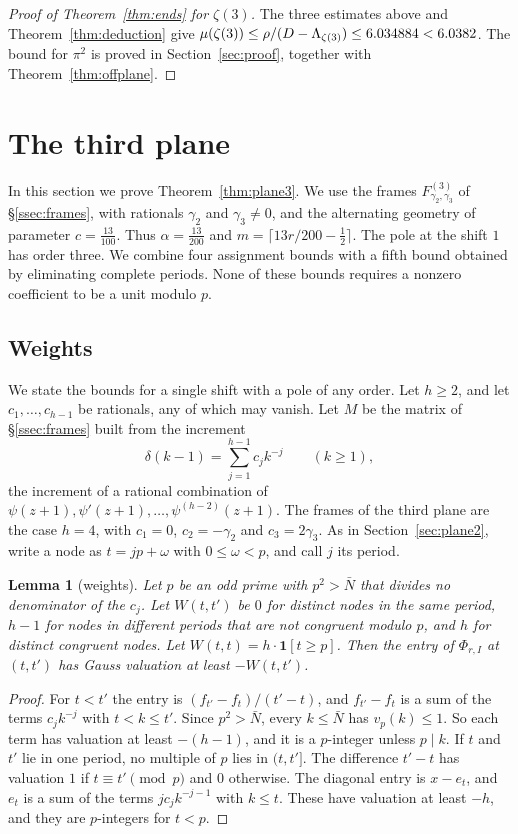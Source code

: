 \documentclass[11pt]{amsart}
\newtheorem{lemma}[theorem]{Lemma}
\theoremstyle{definition}
\theoremstyle{remark}
\numberwithin{equation}{section}
\newcommand{\MuZetaThree}{6.0382}
\begin{document}
\begin{proof}[Proof of Theorem~\ref{thm:ends} for $\zeta(3)$]
The three estimates above and Theorem~\ref{thm:deduction} give
$\mu(\zeta(3))\le\rho/(D-\Lambda_{\zeta(3)})\le\ExpZ<\MuZetaThree$. The bound for $\pi^2$ is proved in
Section~\ref{sec:proof}, together with Theorem~\ref{thm:offplane}.
\end{proof}

\section{The third plane}\label{sec:plane3}

In this section we prove Theorem~\ref{thm:plane3}. We use the frames $F^{(3)}_{\gamma_2,\gamma_3}$
of \S\ref{ssec:frames}, with rationals $\gamma_2$ and $\gamma_3\ne0$, and the alternating geometry of parameter
$c=\frac{13}{100}$. Thus $\alpha=\frac{13}{200}$ and $m=\lceil13r/200-\frac12\rceil$. The pole at the shift $1$ has
order three. We combine four assignment bounds with a fifth bound obtained by eliminating complete periods.
None of these bounds requires a nonzero coefficient to be a unit modulo $p$.

\subsection{Weights}
We state the bounds for a single shift with a pole of any order. Let $h\ge2$, and let $c_1,\dots,c_{h-1}$ be rationals,
any of which may vanish. Let $M$ be the matrix of \S\ref{ssec:frames} built from the increment
\[
 \delta(k-1)=\sum_{j=1}^{h-1}c_jk^{-j}\qquad(k\ge1),
\]
the increment of a rational combination of $\psi(z+1),\psi'(z+1),\dots,\psi^{(h-2)}(z+1)$. The frames of the third
plane are the case $h=4$, with $c_1=0$, $c_2=-\gamma_2$ and $c_3=2\gamma_3$. As in Section~\ref{sec:plane2}, write a
node as $t=jp+\omega$ with $0\le\omega<p$, and call $j$ its period.

\begin{lemma}[weights]\label{lem:weights3}
Let $p$ be an odd prime with $p^2>\bar N$ that divides no denominator of the $c_j$. Let $W(t,t')$ be $0$ for distinct
nodes in the same period, $h-1$ for nodes in different periods that are not congruent modulo $p$, and $h$ for distinct
congruent nodes. Let $W(t,t)=h\cdot\mathbf 1[t\ge p]$. Then the entry of $\Phi_{r,I}$ at $(t,t')$ has Gauss valuation at
least $-W(t,t')$.
\end{lemma}
\begin{proof}
For $t<t'$ the entry is $(f_{t'}-f_t)/(t'-t)$, and $f_{t'}-f_t$ is a sum of the terms $c_jk^{-j}$ with $t<k\le t'$.
Since $p^2>\bar N$, every $k\le\bar N$ has $v_p(k)\le1$. So each term has valuation at least $-(h-1)$, and it is a
$p$-integer unless $p\mid k$. If $t$ and $t'$ lie in one period, no multiple of $p$ lies in $(t,t']$. The difference
$t'-t$ has valuation $1$ if $t\equiv t'\pmod p$ and $0$ otherwise. The diagonal entry is $x-e_t$, and $e_t$ is a sum of
the terms $jc_jk^{-j-1}$ with $k\le t$. These have valuation at least $-h$, and they are $p$-integers for $t<p$.
\end{proof}
\end{document}
